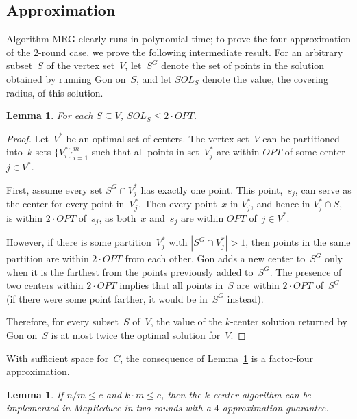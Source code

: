 \documentclass[11pt]{article}
\newtheorem{lemma}[theorem]{Lemma}
\newcommand{\ours}{{\sc MRG}\xspace}
\newcommand{\gon}{{\sc Gon}\xspace}
\newcommand{\OPT}{\ensuremath{\mathit{OPT}}}
\begin{document}
\subsection{Approximation}

Algorithm \ours clearly
runs in polynomial time; to prove the four approximation of the $2$-round
case, we prove the following intermediate result.
For an arbitrary subset~$S$ of the vertex set~$V$,
let~$S^G$ denote the set of points in the solution 
obtained by running \gon on~$S$, and let $\mathit{SOL}_S$ denote the value,
the covering radius, of this solution.

\begin{lemma}\label{thm:approx}
For each $S \subseteq V$, $\mathit{SOL}_S\leq 2\cdot \OPT$.
\end{lemma}


\begin{proof}
Let~$V^*$ be an optimal set of centers.
The vertex set~$V$ can be partitioned into~$k$ sets $\{V^*_i\}_{i=1}^m$
such that  all points in set~$V^*_j$ are within $\mathit{OPT}$ of some
center $j\in V^*$.


First, assume every set $S^G\cap V^*_j$ has exactly one point.
This point,~$s_j$,
can serve as the center
for every point in~$V^*_j$.
Then every point~$x$ in $V^*_j$, and hence in $V_j^* \cap S$, is within
$2\cdot\mathit{OPT}$ of~$s_j$,
as both~$x$ and~$s_j$ are within $\mathit{OPT}$ of~$j \in V^*$.

However, if there is some partition~$V^*_j$
with $|S^G\cap V^*_j| > 1$, then points in the same partition are within $2\cdot \mathit{OPT}$ from each
other. \gon adds a new center to~$S^G$
only when it is the farthest from the points previously added to~$S^G$.
The presence of two centers within $2 \cdot \mathit{OPT}$ implies that all
points in~$S$ are within $2\cdot \mathit{OPT}$ of~$S^G$
(if there were some point farther, it would be in~$S^G$ instead).


Therefore, for every subset~$S$ of~$V$, the value of the $k$-center solution
returned by \gon on~$S$ is at most twice the optimal solution for~$V$.
\end{proof}



With sufficient space for~$C$,
the consequence of Lemma~\ref{thm:approx} is  a  factor-four approximation.
\begin{lemma}
\label{thm:mr}
If $n/ m \leq c$ and $k\cdot m\leq c$, then the $k$-center algorithm can be implemented in MapReduce in two rounds with a $4$-approximation guarantee. 
\end{lemma}
\end{document}
